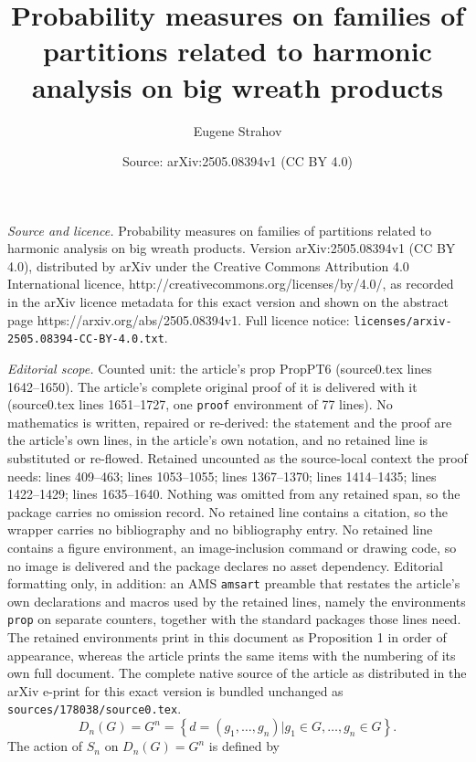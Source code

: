 \documentclass[10pt,a4paper]{amsart}
\title{Probability measures on families of partitions related to harmonic analysis on big wreath products}
\author{Eugene Strahov}
\date{Source: arXiv:2505.08394v1 (CC BY 4.0)}
\begin{document}
\maketitle

\noindent\emph{Source and licence.} Probability measures on families of partitions related to harmonic analysis on big wreath products. Version arXiv:2505.08394v1 (CC BY 4.0), distributed by arXiv under the Creative Commons Attribution 4.0 International licence, http://creativecommons.org/licenses/by/4.0/, as recorded in the arXiv licence metadata for this exact version and shown on the abstract page https://arxiv.org/abs/2505.08394v1. Full licence notice: \texttt{licenses/arxiv-2505.08394-CC-BY-4.0.txt}.\par\smallskip

\noindent\textit{Editorial scope.} Counted unit: the article's prop PropPT6 (source0.tex lines 1642--1650). The article's complete original proof of it is delivered with it (source0.tex lines 1651--1727, one \texttt{proof} environment of 77 lines). No mathematics is written, repaired or re-derived: the statement and the proof are the article's own lines, in the article's own notation, and no retained line is substituted or re-flowed.  Retained uncounted as the source-local context the proof needs: lines 409--463; lines 1053--1055; lines 1367--1370; lines 1414--1435; lines 1422--1429; lines 1635--1640.  Nothing was omitted from any retained span, so the package carries no omission record.  No retained line contains a citation, so the wrapper carries no bibliography and no bibliography entry.  No retained line contains a figure environment, an image-inclusion command or drawing code, so no image is delivered and the package declares no asset dependency.  Editorial formatting only, in addition: an AMS \texttt{amsart} preamble that restates the article's own declarations and macros used by the retained lines, namely the environments \texttt{prop} on separate counters, together with the standard packages those lines need.  The retained environments print in this document as Proposition 1 in order of appearance, whereas the article prints the same items with the numbering of its own full document.  The complete native source of the article as distributed in the arXiv e-print for this exact version is bundled unchanged as \texttt{sources/178038/source0.tex}.
\begin{equation}
D_n(G)=G^n=\left\{d=(g_1,\ldots,g_n)\vert g_1\in G,\ldots,g_n\in G\right\}.
\end{equation}
The action of $S_n$ on $D_n(G)=G^n$ is defined by
\end{document}
